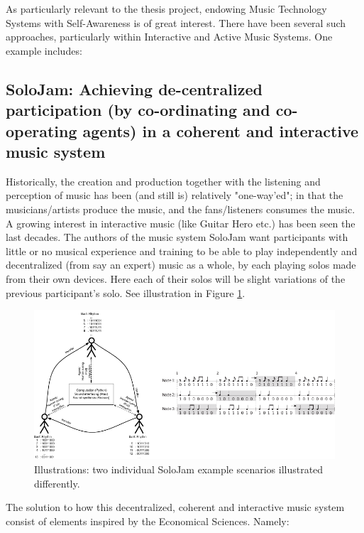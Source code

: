 As particularly relevant to the thesis project, endowing Music Technology Systems with Self-Awareness is of great interest. There have been several such approaches, particularly within Interactive and Active Music Systems. One example includes:

	\subsection{SoloJam: Achieving de-centralized participation (by co-ordinating and co-operating agents) in a coherent and interactive music system}

	Historically, the creation and production together with the listening and perception of music has been (and still is) relatively "one-way'ed"; in that the musicians/artists produce the music, and the fans/listeners consumes the music. A growing interest in interactive music (like Guitar Hero etc.) has been seen the last decades. The authors of the music system SoloJam \cite{solojam} want participants with little or no musical experience and training to be able to play independently and decentralized (from say an expert) music as a whole, by each playing solos made from their own devices. Here each of their solos will be slight variations of the previous participant's solo. See illustration in Figure \ref{fig:solojam}.

	\begin{figure}[!htp]
	\centering
		\includegraphics[width=\columnwidth]{Assets/DocSegments/Chapters/Background/Figures/Schema/SoloJam.pdf}
		\caption{Illustrations: two individual SoloJam example scenarios illustrated differently.}
		\label{fig:solojam}
	\end{figure}

	The solution to how this decentralized, coherent and interactive music system consist of elements inspired by the Economical Sciences. Namely:

